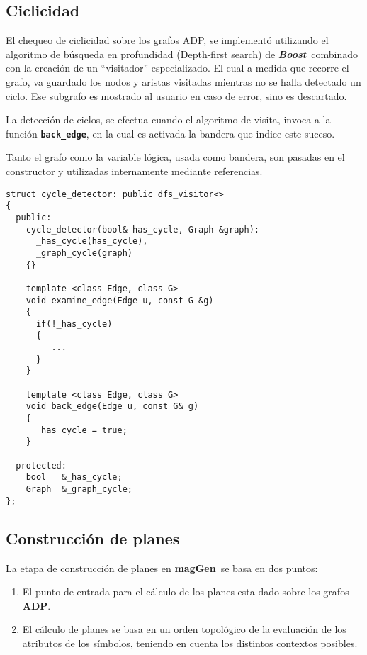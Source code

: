 \documentclass[runningheads,a4paper]{llncs}
\newcommand{\textbtt}[1]{\texttt{\textbf{#1}}}
\newcommand{\maggen}{\textbf{magGen}}
\newcommand{\boost}{\textit{\textbf{Boost}}}
\begin{document}
\subsection{Ciclicidad}

El chequeo de ciclicidad sobre los grafos ADP, se implementó utilizando el algoritmo de búsqueda en profundidad (Depth-first search) de \boost\ combinado con la creación de un ``visitador'' especializado. El cual a medida que recorre el grafo, va guardado los nodos y aristas visitadas mientras no se halla detectado un ciclo. Ese subgrafo es mostrado al usuario en caso de error, sino es descartado.

La detección de ciclos, se efectua cuando el algoritmo de visita, invoca a la función \textbtt{back\_edge}, en la cual es activada la bandera que indice este suceso.

Tanto el grafo como la variable lógica, usada como bandera, son pasadas en el constructor y utilizadas internamente mediante referencias.

\begin{lstlisting}[columns=fullflexible, linewidth=9.2cm]
struct cycle_detector: public dfs_visitor<>
{
  public:
    cycle_detector(bool& has_cycle, Graph &graph):
      _has_cycle(has_cycle), 
      _graph_cycle(graph)
    {}

    template <class Edge, class G>
    void examine_edge(Edge u, const G &g)
    {
      if(!_has_cycle)
      {
         ...
      }
    }

    template <class Edge, class G>
    void back_edge(Edge u, const G& g)
    {
      _has_cycle = true;
    }

  protected:
    bool   &_has_cycle;
    Graph  &_graph_cycle;
};
\end{lstlisting}

\subsection{Construcción de planes}

La etapa de construcción de planes en \maggen\ se basa en dos puntos:

\begin{enumerate}
\item El punto de entrada para el cálculo de los planes esta dado sobre los grafos \textbf{ADP}. 
\item El cálculo de planes se basa en un orden topológico de la evaluación de los atributos de los símbolos, teniendo en cuenta los distintos contextos posibles.
\end{enumerate}
\end{document}

